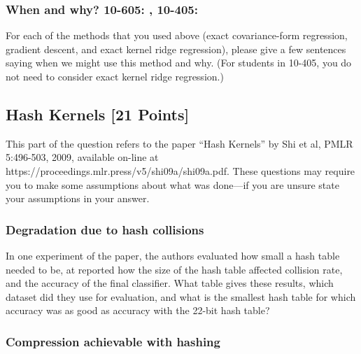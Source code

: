 \subsubsection{When and why? 10-605: , 10-405: }

For each of the methods that you used above (exact covariance-form regression, gradient descent, and exact kernel ridge regression), please give a few sentences saying when we might use this method and why. (For students in 10-405, you do not need to consider exact kernel ridge regression.)

\begin{answer_box}[title=,height=7cm,width=16.5cm]  
    
\end{answer_box}


\subsection{Hash Kernels [21 Points]}
\label{q:regrs4}

This part of the question refers to the paper ``Hash Kernels'' by Shi et al,  PMLR 5:496-503, 2009, available on-line at https://proceedings.mlr.press/v5/shi09a/shi09a.pdf.
These questions may require you to make some assumptions about what was done---if you are unsure state your assumptions in your answer.

\subsubsection{Degradation due to hash collisions }

In one experiment of the paper, the authors evaluated how small a hash table needed to be, at reported how the size of the hash table affected collision rate, and the accuracy of the final classifier.  What table gives these results, which dataset did they use for evaluation, and what is the smallest  hash table for which accuracy was as good as accuracy with the 22-bit hash table?  
\begin{answer_box}[title=,height=3cm,width=16.5cm]  
    
\end{answer_box}

 \subsubsection{Compression achievable with hashing }

